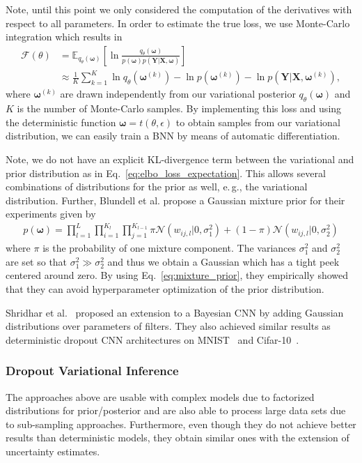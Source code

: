 \documentclass[runningheads]{llncs}
\begin{document}
Note, until this point we only considered the computation of the derivatives with respect to all parameters.
In order to estimate the true loss, we use Monte-Carlo integration which results in
\begin{align}
    \mathcal{F}(\theta) &=  \mathbb{E}_{q_\theta(\boldsymbol{\omega})}\left[ \ln \frac{q_\theta(\boldsymbol{\omega})}{p(\boldsymbol{\omega})p(\mathbf{Y} | \mathbf{X}, \boldsymbol{\omega})} \right]\label{eq:applied_reparam} \\
    &\approx \frac{1}{K}\sum_{k=1}^K \ln q_\theta(\boldsymbol{\omega}^{(k)}) - \ln p(\boldsymbol{\omega}^{(k)}) - \ln p(\mathbf{Y} | \mathbf{X}, \mathbf{\boldsymbol{\omega}}^{(k)}), 
\end{align}
where $\boldsymbol{\omega}^{(k)}$ are drawn independently from our variational posterior $q_\theta(\boldsymbol{\omega})$ and $K$ is the number of Monte-Carlo samples.
By implementing this loss and using the deterministic function $\boldsymbol{\omega} = t(\theta, \epsilon)$ to obtain samples from our variational distribution, we can easily train a BNN by means of automatic differentiation.

Note, we do not have an explicit KL-divergence term between the variational and prior distribution as in Eq.~\ref{eq:elbo_loss_expectation}.
This allows several combinations of distributions for the prior as well, e.\,g., the variational distribution.
Further, Blundell et al. propose a Gaussian mixture prior for their experiments given by
\begin{align}
    p(\boldsymbol{\omega}) = \prod_{l=1}^{L}\prod_{i=1}^{K_l}\prod_{j=1}^{K_{l-1}} \pi\mathcal{N}(w_{ij,l} | 0, \sigma_1^2) + (1 - \pi)\mathcal{N}(w_{ij,l}| 0, \sigma_2^2)\label{eq:mixture_prior}
\end{align}
where $\pi$ is the probability of one mixture component. 
The variances $\sigma_1^2$ and $\sigma_2^2$ are set so that $\sigma_1^2 \gg \sigma_2^2$ and thus we obtain a Gaussian which has a tight peek centered around zero.
By using Eq.~\ref{eq:mixture_prior}, they empirically showed that they can avoid hyperparameter optimization of the prior distribution.

Shridhar et al.~\cite{shridhar2019comprehensive} proposed an extension to a Bayesian CNN by adding Gaussian distributions over parameters of filters.
They also achieved similar results as deterministic dropout CNN architectures on MNIST~\cite{lecun-mnisthandwrittendigit-2010} and Cifar-10~\cite{cifar}.

\subsubsection{Dropout Variational Inference}
\label{sec:dropout_inference}
The approaches above are usable with complex models due to factorized distributions for prior/posterior and are also able to process large data sets due to sub-sampling approaches.
Furthermore, even though they do not achieve better results than deterministic models, they obtain similar ones with the extension of uncertainty estimates.
\end{document}
